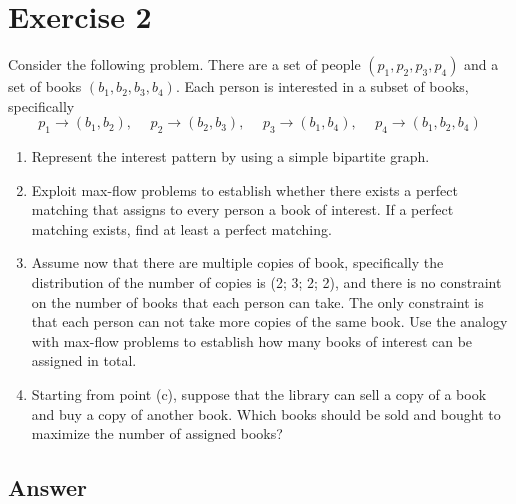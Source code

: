 \documentclass[
	12pt, %
]{fphw}
\begin{document}

\section*{Exercise 2}

	Consider the following problem. There are a set of people $(p_1, p_2, p_3, p_4)$ and a set of books $(b_1, b_2, b_3, b_4)$. Each person is interested in a subset of books, specifically 
	\begin{equation}
	    p_1 \rightarrow (b_1, b_2),\hspace{15pt} p_2 \rightarrow (b_2, b_3),\hspace{15pt} p_3 \rightarrow (b_1, b_4),\hspace{15pt} p_4 \rightarrow (b_1, b_2, b_4)
	    \label{eq:eqRelEx2}
	\end{equation}
	
	
	\begin{enumerate}[(a\normalfont)] %
		\item Represent the interest pattern by using a simple bipartite graph.
		\item Exploit max-flow problems to establish whether there exists a perfect matching that assigns to every person a book of interest. If a perfect matching exists, find at least a perfect matching.
		\item Assume now that there are multiple copies of book, specifically the distribution of the number of copies is (2; 3; 2; 2), and there is no constraint on the number of books that each person can take. The only constraint is that each person can not take more copies of the same book. Use the analogy with max-flow problems to establish how many books of interest can be assigned in total.
		\item Starting from point (c), suppose that the library can sell a copy of a book and buy a copy of another book. Which books should be sold and bought to maximize the number of assigned books?
	\end{enumerate}


\subsection*{Answer}%
\end{document}
